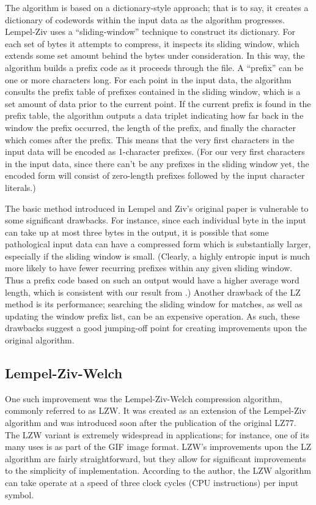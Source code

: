 \documentclass[12pt]{article}
\begin{document}
The algorithm is based on a dictionary-style approach; that is to say,
it creates a dictionary of codewords within the input data as the
algorithm progresses. Lempel-Ziv uses a ``sliding-window'' technique
to construct its dictionary. For each set of bytes it attempts to
compress, it inspects its sliding window, which extends some set
amount behind the bytes under consideration. In this way, the
algorithm builds a prefix code as it proceeds through the file. A
``prefix'' can be one or more characters long. For each point in the
input data, the algorithm consults the prefix table of prefixes
contained in the sliding window, which is a set amount of data prior
to the current point. If the current prefix is found in the prefix
table, the algorithm outputs a data triplet indicating how far back in
the window the prefix occurred, the length of the prefix, and finally
the character which comes after the prefix. This means that the very
first characters in the input data will be encoded as 1-character
prefixes. (For our very first characters in the input data, since
there can't be any prefixes in the sliding window yet, the encoded
form will consist of zero-length prefixes followed by the input
character literals.)

The basic method introduced in Lempel and Ziv's original paper is
vulnerable to some significant drawbacks. For instance, since each
individual byte in the input can take up at most three bytes in the
output, it is possible that some pathological input data can have a
compressed form which is substantially larger, especially if the
sliding window is small. (Clearly, a highly entropic input is much
more likely to have fewer recurring prefixes within any given sliding
window. Thus a prefix code based on such an output would have a higher
average word length, which is consistent with our result from
.) Another drawback of the LZ method is its performance;
searching the sliding window for matches, as well as updating the
window prefix list, can be an expensive operation. As such, these
drawbacks suggest a good jumping-off point for creating improvements
upon the original algorithm.

\subsection{Lempel-Ziv-Welch}

One such improvement was the Lempel-Ziv-Welch compression algorithm,
commonly referred to as LZW. It was created as an extension of the
Lempel-Ziv algorithm and was introduced soon after the publication of
the original LZ77. The LZW variant is extremely widespread in
applications; for instance, one of its many uses is as part of the GIF
image format. LZW's improvements upon the LZ algorithm are fairly
straightforward, but they allow for significant improvements to the
simplicity of implementation. According to the author, the LZW
algorithm can take operate at a speed of three clock cycles (CPU
instructions) per input symbol. \cite{LempelZivWelch}
\end{document}
